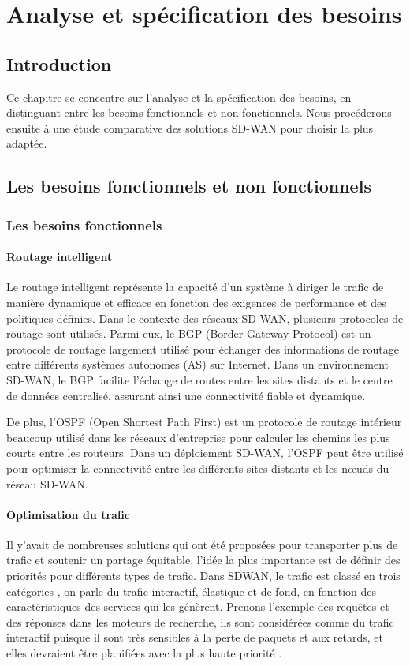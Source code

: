 \chapter{Analyse et spécification des besoins }
\newpage


\section*{Introduction }

Ce chapitre se concentre sur l'analyse et la spécification des besoins, en distinguant entre les besoins fonctionnels et non fonctionnels. Nous procéderons ensuite à une étude comparative des solutions SD-WAN pour choisir la plus adaptée.

\section{Les besoins fonctionnels et non fonctionnels  }
\subsection{Les besoins fonctionnels }
\subsubsection{Routage intelligent  }

Le routage intelligent représente la capacité d'un système à diriger le trafic de manière dynamique et efficace en fonction des exigences de performance et des politiques définies. Dans le contexte des réseaux SD-WAN, plusieurs protocoles de routage sont utilisés. Parmi eux, le BGP (Border Gateway Protocol) est un protocole de routage largement utilisé pour échanger des informations de routage entre différents systèmes autonomes (AS) sur Internet. Dans un environnement SD-WAN, le BGP facilite l'échange de routes entre les sites distants et le centre de données centralisé, assurant ainsi une connectivité fiable et dynamique.

De plus, l'OSPF (Open Shortest Path First) est un protocole de routage intérieur beaucoup utilisé dans les réseaux d'entreprise pour calculer les chemins les plus courts entre les routeurs. Dans un déploiement SD-WAN, l'OSPF peut être utilisé pour optimiser la connectivité entre les différents sites distants et les nœuds du réseau SD-WAN.

\subsubsection{Optimisation du trafic  }
Il y’avait de nombreuses solutions qui  ont été proposées pour transporter plus de trafic et soutenir un partage équitable, l’idée la plus importante est de définir des priorités pour différents types de trafic.
Dans SDWAN, le trafic est classé en trois catégories , on parle du trafic interactif, élastique et de fond, en fonction des caractéristiques des services qui les génèrent.  Prenons l’exemple des requêtes et des réponses dans les moteurs de recherche, ils sont considérées comme du trafic interactif puisque il sont très sensibles à la perte de paquets et aux retards, et elles devraient être planifiées avec la plus haute priorité .

